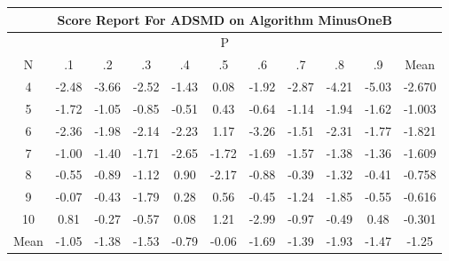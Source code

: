 \documentclass[11pt,a4paper]{report}
\begin{document}
\begin{longtable}{ | c || c | c | c | c | c | c | c | c | c || c |}
\hline
\multicolumn{11}{|c|}{ Score Report For ADSMD on Algorithm MinusOneB} \\
\hline
\multicolumn{11}{|c|}{ P } \\
\hline
N & .1 & .2 & .3 & .4 & .5 & .6 & .7 & .8 & .9 & Mean\\
 \hline
 \hline
 \endhead
  4 &  \cellcolor[HTML]{FFBFBF} -2.48 &  \cellcolor[HTML]{FF9F9F} -3.66 &  \cellcolor[HTML]{FFBFBF} -2.52 &  \cellcolor[HTML]{FFD7D7} -1.43 &  \cellcolor[HTML]{FFFFFF} 0.08 &  \cellcolor[HTML]{FFCFCF} -1.92 &  \cellcolor[HTML]{FFB7B7} -2.87 &  \cellcolor[HTML]{FF9797} -4.21 &  \cellcolor[HTML]{FF8080} -5.03 & -2.670 \\
  5 &  \cellcolor[HTML]{FFD7D7} -1.72 &  \cellcolor[HTML]{FFE7E7} -1.05 &  \cellcolor[HTML]{FFE7E7} -0.85 &  \cellcolor[HTML]{FFEFEF} -0.51 &  \cellcolor[HTML]{F7F7FF} 0.43 &  \cellcolor[HTML]{FFEFEF} -0.64 &  \cellcolor[HTML]{FFDFDF} -1.14 &  \cellcolor[HTML]{FFCFCF} -1.94 &  \cellcolor[HTML]{FFD7D7} -1.62 & -1.003 \\
  6 &  \cellcolor[HTML]{FFC7C7} -2.36 &  \cellcolor[HTML]{FFCFCF} -1.98 &  \cellcolor[HTML]{FFC7C7} -2.14 &  \cellcolor[HTML]{FFC7C7} -2.23 &  \cellcolor[HTML]{DFDFFF} 1.17 &  \cellcolor[HTML]{FFAFAF} -3.26 &  \cellcolor[HTML]{FFD7D7} -1.51 &  \cellcolor[HTML]{FFC7C7} -2.31 &  \cellcolor[HTML]{FFCFCF} -1.77 & -1.821 \\
  7 &  \cellcolor[HTML]{FFE7E7} -1.00 &  \cellcolor[HTML]{FFDFDF} -1.40 &  \cellcolor[HTML]{FFD7D7} -1.71 &  \cellcolor[HTML]{FFBFBF} -2.65 &  \cellcolor[HTML]{FFD7D7} -1.72 &  \cellcolor[HTML]{FFD7D7} -1.69 &  \cellcolor[HTML]{FFD7D7} -1.57 &  \cellcolor[HTML]{FFDFDF} -1.38 &  \cellcolor[HTML]{FFDFDF} -1.36 & -1.609 \\
  8 &  \cellcolor[HTML]{FFEFEF} -0.55 &  \cellcolor[HTML]{FFE7E7} -0.89 &  \cellcolor[HTML]{FFDFDF} -1.12 &  \cellcolor[HTML]{E7E7FF} 0.90 &  \cellcolor[HTML]{FFC7C7} -2.17 &  \cellcolor[HTML]{FFE7E7} -0.88 &  \cellcolor[HTML]{FFF7F7} -0.39 &  \cellcolor[HTML]{FFDFDF} -1.32 &  \cellcolor[HTML]{FFF7F7} -0.41 & -0.758 \\
  9 &  \cellcolor[HTML]{FFFFFF} -0.07 &  \cellcolor[HTML]{FFF7F7} -0.43 &  \cellcolor[HTML]{FFCFCF} -1.79 &  \cellcolor[HTML]{F7F7FF} 0.28 &  \cellcolor[HTML]{EFEFFF} 0.56 &  \cellcolor[HTML]{FFF7F7} -0.45 &  \cellcolor[HTML]{FFDFDF} -1.24 &  \cellcolor[HTML]{FFCFCF} -1.85 &  \cellcolor[HTML]{FFEFEF} -0.55 & -0.616 \\
  10 &  \cellcolor[HTML]{E7E7FF} 0.81 &  \cellcolor[HTML]{FFF7F7} -0.27 &  \cellcolor[HTML]{FFEFEF} -0.57 &  \cellcolor[HTML]{FFFFFF} 0.08 &  \cellcolor[HTML]{DFDFFF} 1.21 &  \cellcolor[HTML]{FFB7B7} -2.99 &  \cellcolor[HTML]{FFE7E7} -0.97 &  \cellcolor[HTML]{FFEFEF} -0.49 &  \cellcolor[HTML]{EFEFFF} 0.48 & -0.301 \\
 \hline
 \hline
Mean &  \cellcolor[HTML]{FFE7E7} -1.05 &  \cellcolor[HTML]{FFDFDF} -1.38 &  \cellcolor[HTML]{FFD7D7} -1.53 &  \cellcolor[HTML]{FFE7E7} -0.79 &  \cellcolor[HTML]{FFFFFF} -0.06 &  \cellcolor[HTML]{FFD7D7} -1.69 &  \cellcolor[HTML]{FFDFDF} -1.39 &  \cellcolor[HTML]{FFCFCF} -1.93 &  \cellcolor[HTML]{FFD7D7} -1.47 &  \cellcolor[HTML]{FFDFDF} -1.25
\end{longtable}
\end{document}
